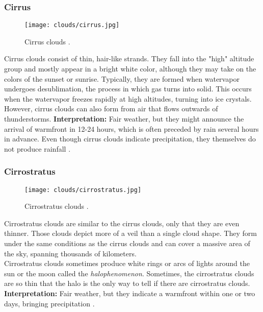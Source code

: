 \pagebreak

\subsubsection{Cirrus}
\begin{wrapfigure}[10]{r}{6.3cm}
    \vspace{-\baselineskip}
    \texttt{[image: clouds/cirrus.jpg]}
    \caption{Cirrus clouds \protect\cite{cloudtypes:wiki:cirrus}.}
    \label{img:clouds:cirrus}
\end{wrapfigure}
Cirrus clouds consist of thin, hair-like strands.
They fall into the "high" altitude group and mostly appear in a bright white color, although they may take on the colors of the sunset or sunrise.
Typically, they are formed when \gls{watervapor} undergoes \gls{desublimation}, the process in which gas turns into solid. This occurs when the \gls{watervapor} freezes rapidly at high altitudes, turning into ice crystals.
\\
\noindent
However, cirrus clouds can also form from air that flows outwards of thunderstorms.
\emptyline
\textbf{Interpretation:} Fair weather, but they might announce the arrival of \gls{warmfront} in 12-24 hours, which is often preceded by rain several hours in advance.
Even though cirrus clouds indicate \gls{precipitation}, they themselves do not produce rainfall \cite{predict:weather}.

\subsubsection{Cirrostratus}
\begin{wrapfigure}[10]{r}{6.3cm}
    \vspace{-\baselineskip}
    \texttt{[image: clouds/cirrostratus.jpg]}
    \caption{Cirrostratus clouds \protect\cite{cloudtypes:wiki:cirrostratus}.}
    \label{img:clouds:cirrostratus}
\end{wrapfigure}
Cirrostratus clouds are similar to the cirrus clouds, only that they are even thinner.
Those clouds depict more of a veil than a single cloud shape.
They form under the same conditions as the cirrus clouds and can cover a massive area of the sky, spanning thousands of kilometers.
\\
\noindent
Cirrostratus clouds sometimes produce white rings or arcs of lights around the sun or the moon called the \emph{\gls{halophenomenon}}.
Sometimes, the cirrostratus clouds are so thin that the halo is the only way to tell if there are cirrostratus clouds.
\emptyline
\textbf{Interpretation:} Fair weather, but they indicate a \gls{warmfront} within one or two days, bringing \gls{precipitation} \cite{cloudtypes:meteoblue}.

